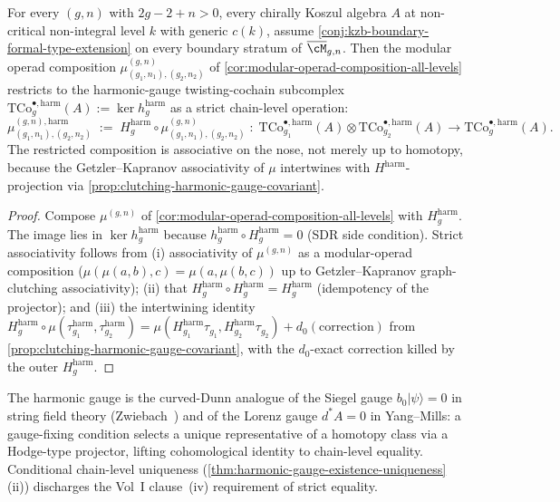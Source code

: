 \begin{corollary}
\label{cor:modular-operad-composition-chain-level-harmonic-gauge}
\ClaimStatusConditional
For every \((g, n)\) with \(2g - 2 + n > 0\), every chirally
Koszul algebra \(A\) at non-critical non-integral level \(k\) with
generic \(c(k)\), assume
\autoref{conj:kzb-boundary-formal-type-extension} on every
boundary stratum of \(\overline{\cM}_{g,n}\). Then the modular
operad composition
\(\mu_{(g_{1}, n_{1}), (g_{2}, n_{2})}^{(g, n)}\) of
\autoref{cor:modular-operad-composition-all-levels} restricts to
the harmonic-gauge twisting-cochain subcomplex
\(\mathrm{TCo}^{\bullet,\mathrm{harm}}_{g}(A) := \ker
h^{\mathrm{harm}}_{g}\) as a strict chain-level operation:
\[
 \mu_{(g_{1}, n_{1}), (g_{2}, n_{2})}^{(g, n), \mathrm{harm}}
 \;:=\;
 H^{\mathrm{harm}}_{g} \circ
 \mu_{(g_{1}, n_{1}), (g_{2}, n_{2})}^{(g, n)}
 \;:\;
 \mathrm{TCo}^{\bullet,\mathrm{harm}}_{g_{1}}(A)
 \otimes \mathrm{TCo}^{\bullet,\mathrm{harm}}_{g_{2}}(A)
 \to \mathrm{TCo}^{\bullet,\mathrm{harm}}_{g}(A).
\]
The restricted composition is associative on the nose, not merely
up to homotopy, because the Getzler--Kapranov associativity of
\(\mu\) intertwines with \(H^{\mathrm{harm}}\)-projection via
\autoref{prop:clutching-harmonic-gauge-covariant}.
\end{corollary}

\begin{proof}
Compose \(\mu^{(g, n)}\) of
\autoref{cor:modular-operad-composition-all-levels} with
\(H^{\mathrm{harm}}_{g}\). The image lies in
\(\ker h^{\mathrm{harm}}_{g}\) because \(h^{\mathrm{harm}}_{g}
\circ H^{\mathrm{harm}}_{g} = 0\) (SDR side condition). Strict
associativity follows from (i) associativity of \(\mu^{(g, n)}\)
as a modular-operad composition (\(\mu(\mu(a, b), c) = \mu(a,
\mu(b, c))\) up to Getzler--Kapranov graph-clutching associativity);
(ii) that
\(H^{\mathrm{harm}}_{g} \circ H^{\mathrm{harm}}_{g}
= H^{\mathrm{harm}}_{g}\) (idempotency of the projector); and
(iii) the intertwining identity
\(H^{\mathrm{harm}}_{g} \circ \mu(\tau_{g_{1}}^{\mathrm{harm}},
\tau_{g_{2}}^{\mathrm{harm}}) =
\mu(H^{\mathrm{harm}}_{g_{1}} \tau_{g_{1}}, H^{\mathrm{harm}}_{g_{2}}
\tau_{g_{2}}) + d_{0}(\text{correction})\) from
\autoref{prop:clutching-harmonic-gauge-covariant}, with the
\(d_{0}\)-exact correction killed by the outer
\(H^{\mathrm{harm}}_{g}\).
\end{proof}

\begin{remark}
\label{rem:gauge-fixing-discipline}
The harmonic gauge is the curved-Dunn analogue of the Siegel gauge
\(b_{0} |\psi\rangle = 0\) in string field theory
(Zwiebach~\cite{Zwiebach93}) and of the Lorenz gauge
\(d^{\ast} A = 0\) in Yang--Mills: a gauge-fixing condition
selects a unique representative of a homotopy class via a
Hodge-type projector, lifting cohomological identity to chain-level
equality. Conditional chain-level uniqueness
(\autoref{thm:harmonic-gauge-existence-uniqueness}(ii)) discharges
the Vol~I clause~(iv) requirement of strict equality.
\end{remark}

